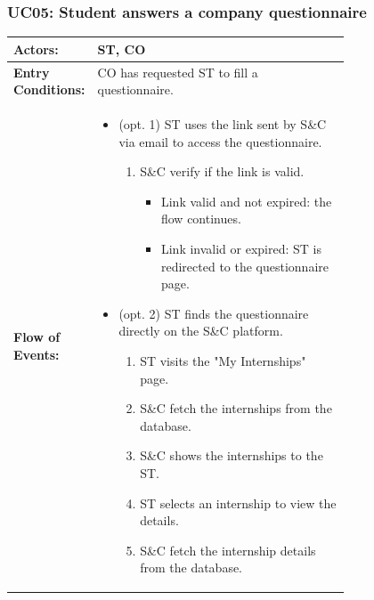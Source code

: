 
\subsubsection{UC05: Student answers a company questionnaire}
\label{subsubsec:student-answers-a-company-questionnaire}

\begin{center}
    \begin{longtable}{|l|p{0.75\linewidth}|}
        \hline
        \textbf{Actors:}           & ST, CO                                                                             \\
        \hline
        \textbf{Entry Conditions:} & CO has requested ST to fill a questionnaire.                                       \\
        \hline
        \textbf{Flow of Events:}   & \begin{itemize}
                                         \item (opt. 1) ST uses the link sent by S\&C via email to access the questionnaire.
                                               \begin{enumerate}
                      \item S\&C verify if the link is valid.
                            \begin{itemize}
                                \item Link valid and not expired: the flow continues.
                                \item Link invalid or expired: ST is redirected to the questionnaire page.
                            \end{itemize}
                  \end{enumerate}
                                         \item (opt. 2) ST finds the questionnaire directly on the S\&C platform.
                                               \begin{enumerate}
                      \item ST visits the "My Internships" page.
                      \item S\&C fetch the internships from the database.
                      \item S\&C shows the internships to the ST.
                      \item ST selects an internship to view the details.
                      \item S\&C fetch the internship details from the database.

\end{enumerate}
\end{itemize}
\end{longtable}
\end{center}
